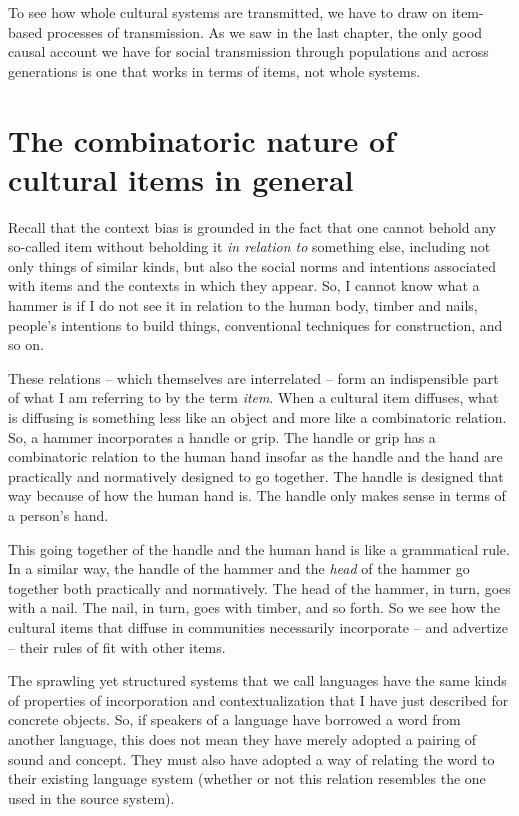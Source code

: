To see how whole cultural systems are transmitted, we have to draw on item-based processes of transmission. As we 
saw in the last chapter, the only good causal account we have for social 
transmission through populations and across generations is one that 
works in terms of items, not whole systems.



\section{The combinatoric nature of cultural items in general}


Recall that the context bias is grounded in the fact that one cannot 
behold any so-called item without beholding it \textit{in relation to}
something else, including not only things of similar kinds, but also the social norms and intentions associated with items and 
the contexts in which they appear. So, I cannot know what a hammer is if I do not see it in relation to the human body, 
timber and nails, people's intentions to build things, conventional 
techniques for construction, and so on. 



These relations -- which themselves are interrelated -- form an indispensible 
part of what I am referring to by the term \textit{item}. When a cultural item 
diffuses, what is diffusing is something less like an object 
and more like a combinatoric relation. So, a hammer incorporates a 
handle or grip. The handle or grip has a combinatoric relation to the 
human hand insofar as the handle and the hand are practically and 
normatively designed to go together. The handle is designed that way 
because of how the human hand is. The handle only makes sense in terms 
of a person's hand. 



This going together of the handle and the human hand is like a grammatical 
rule. In a similar way, the handle of the hammer and the \textit{head} of the 
hammer go together both 
practically and normatively. The head of the hammer, in turn, goes with a nail. The nail, in turn, goes with timber, and so forth. So we see how the cultural items that diffuse in communities necessarily 
incorporate -- and advertize -- their rules of fit with other items. 



The sprawling yet structured systems that we call languages have the same kinds of properties of incorporation and contextualization that I 
have just described for concrete objects. So, if speakers of a 
language have borrowed a word from another language, this does not mean they have 
merely adopted a pairing of sound and concept. They must also have adopted a way of relating the word to their existing language system 
(whether or not this relation resembles the one used in the source 
system). 



